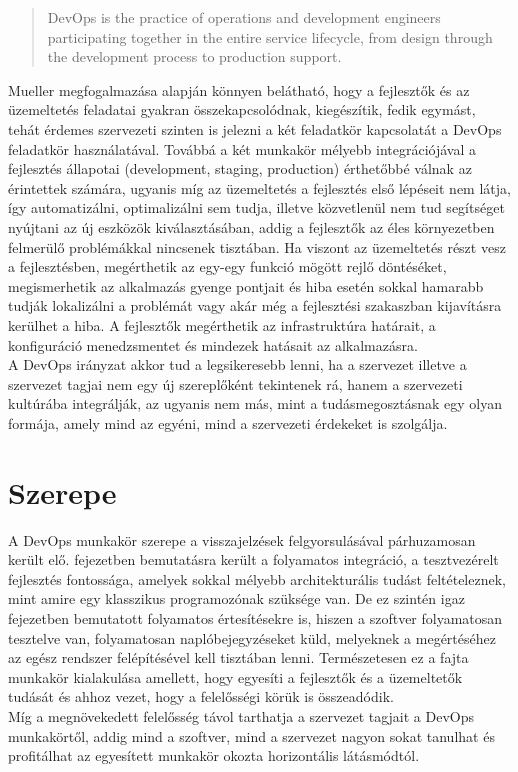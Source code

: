 \begin{quote}
DevOps is the practice of operations and development engineers participating together in the entire service lifecycle, from design through the development process to production support.
\end{quote}
\begin{flushright}
\citet*{agile_admin}
\end{flushright}

Mueller megfogalmazása alapján könnyen belátható, hogy a fejlesztők és az üzemeltetés feladatai gyakran összekapcsolódnak, kiegészítik, fedik egymást, tehát érdemes szervezeti szinten is jelezni a két feladatkör kapcsolatát a DevOps feladatkör használatával.
Továbbá a két munkakör mélyebb integrációjával a fejlesztés állapotai (development, staging, production) érthetőbbé válnak az érintettek számára, ugyanis míg az üzemeltetés a fejlesztés első lépéseit nem látja, így automatizálni, optimalizálni sem tudja, illetve közvetlenül nem tud segítséget nyújtani az új eszközök kiválasztásában, addig a fejlesztők az éles környezetben felmerülő problémákkal nincsenek tisztában. Ha viszont az üzemeltetés részt vesz a fejlesztésben, megérthetik az egy-egy funkció mögött rejlő döntéséket, megismerhetik az alkalmazás gyenge pontjait és hiba esetén sokkal hamarabb tudják lokalizálni a problémát vagy akár még a fejlesztési szakaszban kijavításra kerülhet a hiba. A fejlesztők megérthetik az infrastruktúra határait, a konfiguráció menedzsmentet és mindezek hatásait az alkalmazásra.\\
A DevOps irányzat akkor tud a legsikeresebb lenni, ha a szervezet illetve a szervezet tagjai nem egy új szereplőként tekintenek rá, hanem a szervezeti kultúrába integrálják, az ugyanis nem más, mint a tudásmegosztásnak egy olyan formája, amely mind az egyéni, mind a szervezeti érdekeket is szolgálja.

\section{Szerepe}

A DevOps munkakör szerepe a visszajelzések felgyorsulásával párhuzamosan került elő.  fejezetben bemutatásra került a folyamatos integráció, a tesztvezérelt fejlesztés fontossága, amelyek sokkal mélyebb architekturális tudást feltételeznek, mint amire egy klasszikus programozónak szüksége van. De ez szintén igaz  fejezetben bemutatott folyamatos értesítésekre is, hiszen a szoftver folyamatosan tesztelve van, folyamatosan naplóbejegyzéseket küld, melyeknek a megértéséhez az egész rendszer felépítésével kell tisztában lenni. Természetesen ez a fajta munkakör kialakulása amellett, hogy egyesíti a fejlesztők és a üzemeltetők tudását és ahhoz vezet, hogy a felelősségi körük is összeadódik.\\
Míg a megnövekedett felelősség távol tarthatja a szervezet tagjait a DevOps munkakörtől, addig mind a szoftver, mind a szervezet nagyon sokat tanulhat és profitálhat az egyesített munkakör okozta horizontális látásmódtól.


